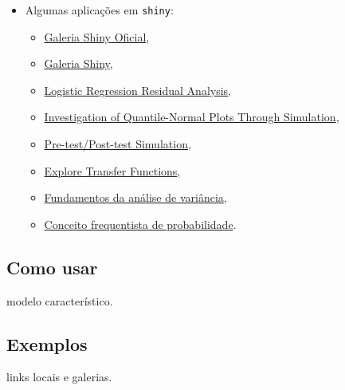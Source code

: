 \begin{frame}

  \begin{itemize}
  \item Algumas aplicações em \texttt{shiny}:
  \begin{itemize}
    \itemsep1pt\parskip0pt
  \item \href{http://shiny.rstudio.com/gallery/}{Galeria Shiny Oficial},
  \item \href{http://www.showmeshiny.com/}{Galeria Shiny},
  \item \href{http://www.stat.cmu.edu:3838/hseltman/LogReg/}{Logistic
      Regression Residual Analysis},
  \item
    \href{https://hseltman.shinyapps.io/QuantileNormal}{Investigation of
      Quantile-Normal Plots Through Simulation},
  \item
    \href{http://www.stat.cmu.edu:3838/hseltman/PrePost/}{Pre-test/Post-test
      Simulation},
  \item
    \href{http://www.stat.cmu.edu:3838/hseltman/TransferFunctions/}{Explore
      Transfer Functions},
  \item
    \href{http://nbcgib.uesc.br/lec/avale-es/amb-virtual/inferencia/anava}{Fundamentos
      da análise de variância},
  \item
    \href{http://nbcgib.uesc.br/lec/avale-es/amb-virtual/probabilidade/con-frequentista}{Conceito
      frequentista de probabilidade}.
  \end{itemize}
\end{itemize}

\end{frame}


\subsection{Como usar}

\begin{frame}

modelo característico.

\end{frame}


\subsection{Exemplos}

\begin{frame}

links locais e galerias.

\end{frame}